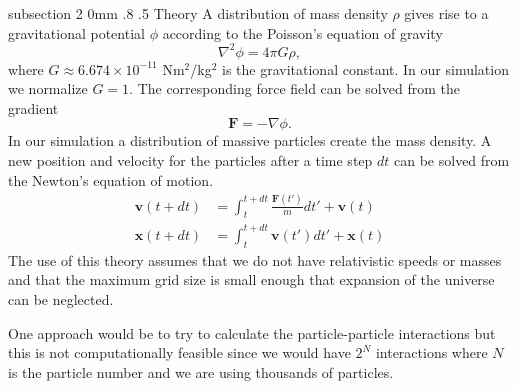 \documentclass[notitlepage, 12pt]{article}
\makeatletter
\renewcommand{\subsection}{\@startsection    %
        {subsection}
        {2}
        {0mm}
        {.8\baselineskip}
        {.5\baselineskip}
        {\bfseries\normalsize}}
\makeatother
\begin{document}
\subsection{Theory}
A distribution of mass density $\rho$ gives rise to a gravitational potential $\phi$ according to the Poisson's equation of gravity
\begin{equation}
\nabla^2 \phi = 4\pi G \rho,
\end{equation}
where $G\approx 6.674\times10^{-11}$ Nm$^2$/kg$^2$ is the gravitational constant. In our simulation we normalize $G=1$. The corresponding force field can be solved from the gradient
\begin{equation}
\mathbf{F} = -\nabla \phi.
\end{equation}
In our simulation a distribution of massive particles create the mass density. A new position and velocity for the particles after a time step $dt$ can be solved from the Newton's equation of motion.
\begin{align}
\mathbf{v}(t+dt) &= \int_{t}^{t+dt}\frac{\mathbf{F}(t')}{m}dt' +  \mathbf{v}(t)\\
\mathbf{x}(t+dt) &= \int_{t}^{t+dt}\mathbf{v}(t')dt' +  \mathbf{x}(t)
\end{align}
The use of this theory assumes that we do not have relativistic speeds or masses and that the maximum grid size is small enough that expansion of the universe can be neglected.

One approach would be to try to calculate the particle-particle interactions but this is not computationally feasible since we would have $2^N$ interactions where $N$ is the particle number and we are using thousands of particles.  

\end{document}
